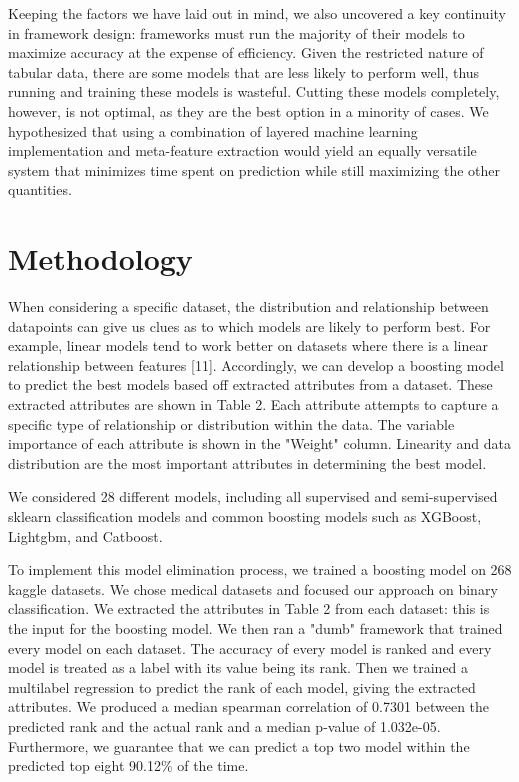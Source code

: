\documentclass{article}
\begin{document}
Keeping the factors we have laid out in mind, we also uncovered a key continuity in framework design: frameworks must run the majority of their models to maximize accuracy at the expense of efficiency. Given the restricted nature of tabular data, there are some models that are less likely to perform well, thus running and training these models is wasteful. Cutting these models completely, however, is not optimal, as they are the best option in a minority of cases. We hypothesized that using a combination of layered machine learning implementation and meta-feature extraction would yield an equally versatile system that minimizes time spent on prediction while still maximizing the other quantities. 

\section{Methodology}
When considering a specific dataset, the distribution and relationship between datapoints can give us clues as to which models are likely to perform best. For example, linear models tend to work better on datasets where there is a linear relationship between features [11]. Accordingly, we can develop a boosting model to predict the best models based off extracted attributes from a dataset. These extracted attributes are shown in Table 2. Each attribute attempts to capture a specific type of relationship or distribution within the data. The variable importance of each attribute is shown in the "Weight" column. Linearity and data distribution are the most important attributes in determining the best model.

We considered 28 different models, including all supervised and semi-supervised sklearn classification models and common boosting models such as XGBoost, Lightgbm, and Catboost.

To implement this model elimination process, we trained a boosting model on 268 kaggle datasets. We chose medical datasets and focused our approach on binary classification. We extracted the attributes in Table 2 from each dataset: this is the input for the boosting model. We then ran a "dumb" framework that trained every model on each dataset. The accuracy of every model is ranked and every model is treated as a label with its value being its rank. Then we trained a multilabel regression to predict the rank of each model, giving the extracted attributes. We produced a median spearman correlation of 0.7301 between the predicted rank and the actual rank and a median p-value of 1.032e-05. Furthermore, we guarantee that we can predict a top two model within the predicted top eight 90.12\% of the time.
\end{document}
